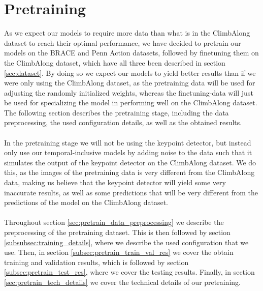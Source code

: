 \documentclass[./main.tex]{subfiles}
\begin{document}
\section{Pretraining}
\label{sec:pretraining}
As we expect our models to require more data than what is in the ClimbAlong dataset to reach their optimal performance, we have decided to pretrain our models on the BRACE and Penn Action datasets, followed by finetuning them on the ClimbAlong dataset, which have all three been described in section \ref{sec:dataset}. By doing so we expect our models to yield better results than if we were only using the ClimbAlong dataset, as the pretraining data will be used for adjusting the randomly initialized weights, whereas the finetuning-data will just be used for specializing the model in performing well on the ClimbAlong dataset. The following section describes the pretraining stage, including the data preprocessing, the used configuration details, as well as the obtained results.
\\
\\
In the pretraining stage we will not be using the keypoint detector, but instead only use our temporal-inclusive models by adding noise to the data such that it simulates the output of the keypoint detector on the ClimbAlong dataset. We do this, as the images of the pretraining data is very different from the ClimbAlong data, making us believe that the keypoint detector will yield some very inaccurate results, as well as some predictions that will be very different from the predictions of the model on the ClimbAlong dataset.
\\
\\
Throughout section \ref{sec:pretrain_data_preprocessing} we describe the preprocessing of the pretraining dataset. This is then followed by section \ref{subsubsec:training_details}, where we describe the used configuration that we use. Then, in section \ref{subsec:pretrain_train_val_res} we cover the obtain training and validation results, which is followed by section \ref{subsec:pretrain_test_res}, where we cover the testing results. Finally, in section \ref{sec:pretrain_tech_details} we cover the technical details of our pretraining.
\end{document}
